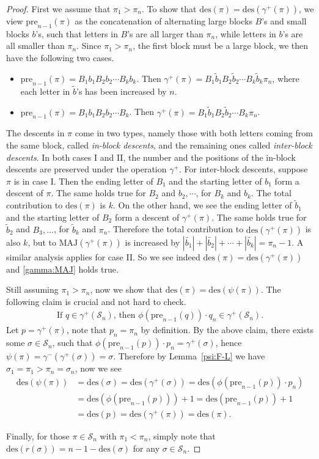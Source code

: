 \documentclass[12pt]{amsart}
\numberwithin{equation}{section}
\theoremstyle{plain}
\theoremstyle{definition}
\def\MAJ{\mathrm{MAJ}}
\def\des{\mathrm{des}}
\def\pre{\mathrm{pre}}
\def\SS{\mathcal{S}}
\begin{document}
\begin{proof}
First we assume that $\pi_1>\pi_n$. To show that $\des(\pi)=\des(\gamma^{+}(\pi))$, we view $\pre_{n-1}(\pi)$ as the concatenation of alternating large blocks $B$'s and small blocks $b$'s, such that letters in $B$'s are all larger than $\pi_n$, while letters in $b$'s are all smaller than $\pi_n$. Since $\pi_1>\pi_n$, the first block must be a large block, we then have the following two cases.
\begin{itemize}
	\item[I.] $\pre_{n-1}(\pi)=B_1b_1B_2b_2\cdots B_kb_k$. Then $\gamma^+(\pi)=B_1\tilde{b}_1B_2\tilde{b}_2\cdots B_k\tilde{b}_k\pi_n$, where each letter in $\tilde{b}$'s has been increased by $n$.
	\item[II.] $\pre_{n-1}(\pi)=B_1b_1B_2b_2\cdots B_k$. Then $\gamma^+(\pi)=B_1\tilde{b}_1B_2\tilde{b}_2\cdots B_k\pi_n$.
\end{itemize}
The descents in $\pi$ come in two types, namely those with both letters coming from the same block, called \emph{in-block descents}, and the remaining ones called \emph{inter-block descents}. In both cases I and II, the number and the positions of the in-block descents are preserved under the operation $\gamma^{+}$. For inter-block descents, suppose $\pi$ is in case I. Then the ending letter of $B_1$ and the starting letter of $b_1$ form a descent of $\pi$. The same holds true for $B_2$ and $b_2,\cdots$, for $B_k$ and $b_k$. The total contribution to $\des(\pi)$ is $k$. On the other hand, we see the ending letter of $\tilde{b}_1$ and the starting letter of $B_2$ form a descent of $\gamma^{+}(\pi)$. The same holds true for $\tilde{b}_2$ and $B_3,\ldots$, for $\tilde{b}_k$ and $\pi_n$. Therefore the total contribution to $\des(\gamma^+(\pi))$ is also $k$, but to $\MAJ(\gamma^+(\pi))$ is increased by $|\tilde{b_1}|+|\tilde{b_2}|+\cdots+|\tilde{b_k}|=\pi_n-1$. A similar analysis applies for case II. So we see indeed $\des(\pi)=\des(\gamma^+(\pi))$ and \eqref{gamma:MAJ} holds true.

Still assuming $\pi_1>\pi_n$, now we show that $\des(\pi)=\des(\psi(\pi))$. The following claim is crucial and not hard to check.
\begin{align*}
\text{If $q\in\gamma^+(\SS_n)$, then } \phi(\pre_{n-1}(q))\cdot q_n\in\gamma^+(\SS_n).
\end{align*}
Let $p=\gamma^+(\pi)$, note that $p_n=\pi_n$ by definition. By the above claim, there exists some $\sigma\in\SS_n$, such that $\phi(\pre_{n-1}(p))\cdot p_n=\gamma^+(\sigma)$, hence $\psi(\pi)=\gamma^-(\gamma^+(\sigma))=\sigma$. Therefore by Lemma~\ref{psi:F-L} we have $\sigma_1=\pi_1>\pi_n=\sigma_n$, now we see
\begin{align*}
\des(\psi(\pi)) &= \des(\sigma)=\des(\gamma^+(\sigma))=\des(\phi(\pre_{n-1}(p))\cdot p_n)\\
&=\des(\phi(\pre_{n-1}(p)))+1=\des(\pre_{n-1}(p))+1\\
&=\des(p)=\des(\gamma^+(\pi))=\des(\pi).
\end{align*}

Finally, for those $\pi\in\SS_n$ with $\pi_1<\pi_n$, simply note that $\des(r(\sigma))=n-1-\des(\sigma)$ for any $\sigma\in\SS_n$.
\end{proof}
\end{document}
